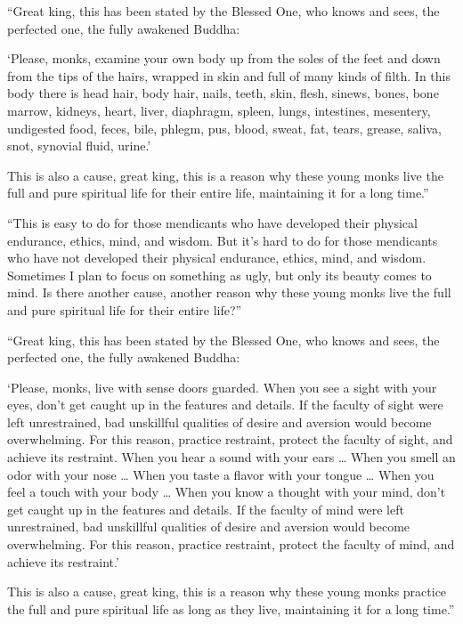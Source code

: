 \documentclass[12pt,openany]{book}%
\begin{document}
“Great king, this has been stated by the Blessed One, who knows and sees, the perfected one, the fully awakened Buddha: 

‘Please, monks, examine your own body up from the soles of the feet and down from the tips of the hairs, wrapped in skin and full of many kinds of filth. In this body there is head hair, body hair, nails, teeth, skin, flesh, sinews, bones, bone marrow, kidneys, heart, liver, diaphragm, spleen, lungs, intestines, mesentery, undigested food, feces, bile, phlegm, pus, blood, sweat, fat, tears, grease, saliva, snot, synovial fluid, urine.’ 

This is also a cause, great king, this is a reason why these young monks live the full and pure spiritual life for their entire life, maintaining it for a long time.” 

“This is easy to do for those mendicants who have developed their physical endurance, ethics, mind, and wisdom. But it’s hard to do for those mendicants who have not developed their physical endurance, ethics, mind, and wisdom. Sometimes I plan to focus on something as ugly, but only its beauty comes to mind. Is there another cause, another reason why these young monks live the full and pure spiritual life for their entire life?” 

“Great king, this has been stated by the Blessed One, who knows and sees, the perfected one, the fully awakened Buddha: 

‘Please, monks, live with sense doors guarded. When you see a sight with your eyes, don’t get caught up in the features and details. If the faculty of sight were left unrestrained, bad unskillful qualities of desire and aversion would become overwhelming. For this reason, practice restraint, protect the faculty of sight, and achieve its restraint. When you hear a sound with your ears … When you smell an odor with your nose … When you taste a flavor with your tongue … When you feel a touch with your body … When you know a thought with your mind, don’t get caught up in the features and details. If the faculty of mind were left unrestrained, bad unskillful qualities of desire and aversion would become overwhelming. For this reason, practice restraint, protect the faculty of mind, and achieve its restraint.’ 

This is also a cause, great king, this is a reason why these young monks practice the full and pure spiritual life as long as they live, maintaining it for a long time.” 
\end{document}
